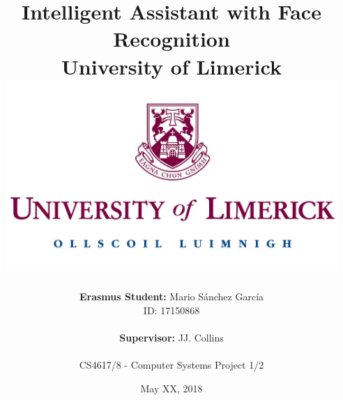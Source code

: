 \documentclass[a4paper,12pt,fleqn]{report}
\title{
	{Intelligent Assistant with Face Recognition}\\
	{\large University of Limerick}\\
	{\includegraphics[max width=126mm]{university.jpg}}
	\vspace{0.8cm}
}
\author{
	\textbf{Erasmus Student:} Mario Sánchez García\\
	ID: 17150868\\
	\\
	\textbf{Supervisor:} JJ. Collins\\
	\\
	CS4617/8 - Computer Systems Project 1/2
}
\date{May XX, 2018}
\def \chapterspath {./chapters}
\begin{document}
\maketitle
\vfill




%
%
\tableofcontents

%
%
\listoffigures

%
%
\listoftables







%

  
\end{document}
